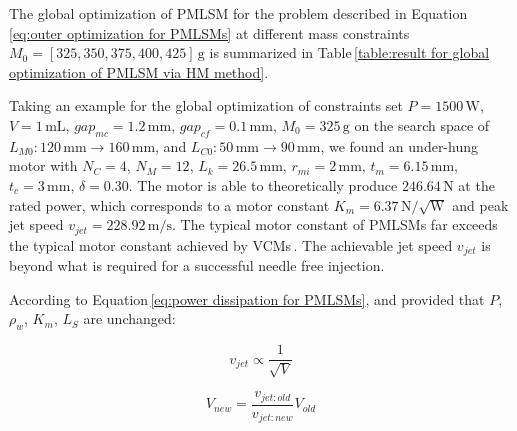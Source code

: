             
        The global optimization of \acs{PMLSM} for the problem described in Equation\,\ref{eq:outer optimization for PMLSMs} at different mass constraints $M_0=[325,350,375,400,425]\,\mathrm{g}$ is summarized in Table\,\ref{table:result for global optimization of PMLSM via HM method}.
            
            
        Taking an example for the global optimization of constraints set $P=1500\,\mathrm{W}$, $V=1\,\mathrm{mL}$, $gap_{mc}=1.2\,\mathrm{mm}$, $gap_{cf}=0.1\,\mathrm{mm}$, $M_0=325\,\mathrm{g}$ on the search space of $L_{M0}:120\,\mathrm{mm}\rightarrow 160\,\mathrm{mm}$, and $L_{C0}:50\,\mathrm{mm}\rightarrow 90\,\mathrm{mm}$, we found an under-hung motor with $N_C=4$, $N_M=12$, $L_k=26.5\,\mathrm{mm}$, $r_{mi}=2\,\mathrm{mm}$, $t_m=6.15\,\mathrm{mm}$, $t_c=3\,\mathrm{mm}$, $\delta=0.30$. The motor is able to theoretically produce $246.64\,\mathrm{N}$ at the rated power, which corresponds to a motor constant $K_m=6.37\,\mathrm{N/\sqrt{W}}$ and peak jet speed $v_{jet}=228.92\,\mathrm{m/s}$. The typical motor constant of \acsp{PMLSM} far exceeds the typical motor constant achieved by \acsp{VCM}\,\cite{ruddy2014}. The achievable jet speed $v_{jet}$ is beyond what is required for a successful needle free injection.
            
            
        According to Equation\,\ref{eq:power dissipation for PMLSMs}, and provided that $P$, $\rho_w$, $K_m$, $L_S$ are unchanged:
            
            
        \begin{equation}
            v_{jet}\propto\frac{1}{\sqrt{V}}
            \label{eq:v_jet and V}
        \end{equation}
            
            
        \begin{equation}
            V_{new}=\frac{v_{jet:old}}{v_{jet:new}}V_{old}
            \label{eq:v_jet and V ratio}
        \end{equation}
        
